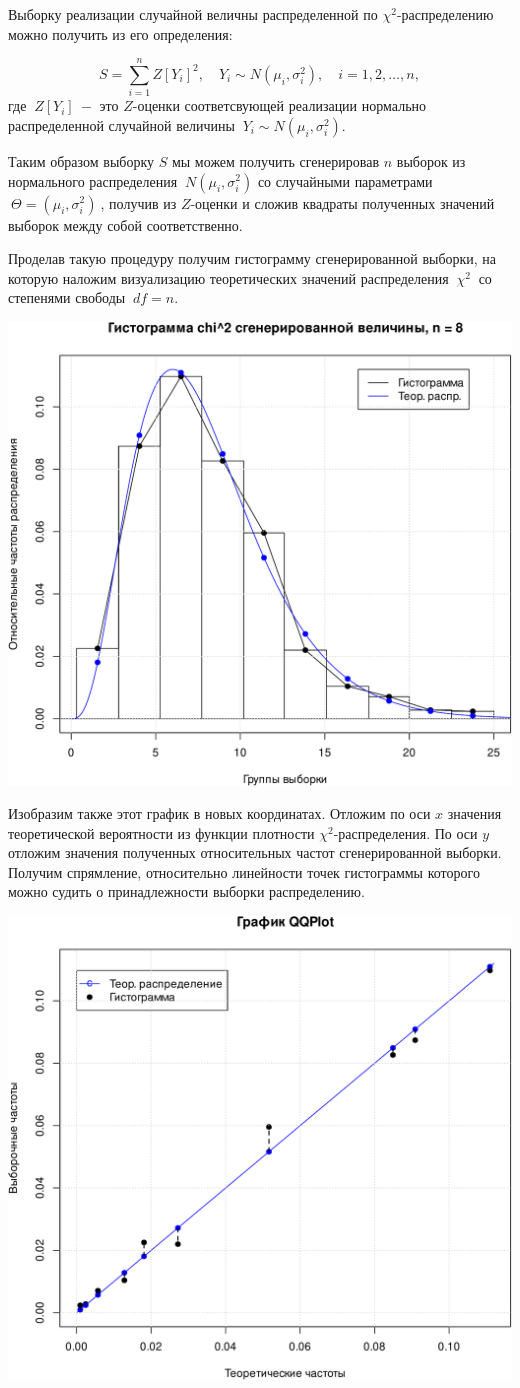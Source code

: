 \documentclass[
]{article}
\begin{document}
Выборку реализации случайной величны распределенной по
\(\chi^2\)-распределению можно получить из его определения:

\[
S = \sum_{i=1}^{n} Z[Y_i]^2,\quad  Y_i \sim N(\mu_i, \sigma_i^2), \quad i=1,2,\dots,n,
\] где \(\ Z[Y_i]\ -\) это \(Z\)-оценки соответсвующей реализации
нормально распределенной случайной величины
\(\ Y_i \sim N(\mu_i, \sigma_i^2)\).

Таким образом выборку \(S\) мы можем получить сгенерировав \(n\) выборок
из нормального распределения \(\ N(\mu_i, \sigma_i^2)\) со случайными
параметрами \(\ \Theta = (\mu_i, \sigma_i^2)\ \), получив из
\(Z\)-оценки и сложив квадраты полученных значений выборок между собой
соответственно.

Проделав такую процедуру получим гистограмму сгенерированной выборки, на
которую наложим визуализацию теоретических значений распределения
\(\ \chi^2\ \) со степенями свободы \(\ df = n\).

\begin{center}\includegraphics[width=0.6\linewidth]{Prac4_files/figure-latex/unnamed-chunk-5-1} \end{center}

Изобразим также этот график в новых координатах. Отложим по оси \(x\)
значения теоретической вероятности из функции плотности
\(\chi^2\)-распределения. По оси \(y\) отложим значения полученных
относительных частот сгенерированной выборки. Получим спрямление,
относительно линейности точек гистограммы которого можно судить о
принадлежности выборки распределению.

\begin{center}\includegraphics[width=0.6\linewidth]{Prac4_files/figure-latex/unnamed-chunk-6-1} \end{center}
\end{document}
